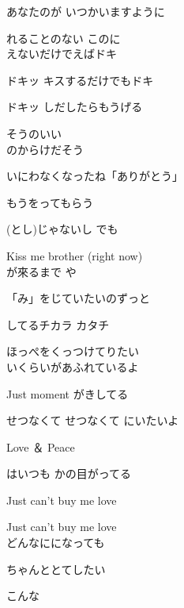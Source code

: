 \large{

あなたのが いつかいますように

れることのない このに
\\

えないだけでえばドキ

ドキッ キスするだけでもドキ

ドキッ しだしたらもうげる

そうのいい
\\

のからけだそう

いにわなくなったね「ありがとう」

もうをってもらう


(とし)じゃないし でも

Kiss me brother (right now)
\\

が來るまで や

「み」をじていたいのずっと

してるチカラ カタチ

ほっぺをくっつけてりたい
\\

いくらいがあふれているよ

Just moment   がきしてる

せつなくて せつなくて にいたいよ

Love ＆ Peace

はいつも かの目がってる

Just can't buy me love

Just can't buy me love
\\

どんなにになっても

ちゃんととてしたい

 こんな

}
